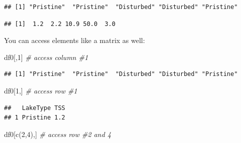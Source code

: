 \documentclass[
]{article}
\newenvironment{Shaded}{\begin{snugshade}}{\end{snugshade}}
\newcommand{\CommentTok}[1]{\textcolor[rgb]{0.56,0.35,0.01}{\textit{#1}}}
\newcommand{\DecValTok}[1]{\textcolor[rgb]{0.00,0.00,0.81}{#1}}
\newcommand{\FunctionTok}[1]{\textcolor[rgb]{0.00,0.00,0.00}{#1}}
\newcommand{\NormalTok}[1]{#1}
\newcommand{\SpecialCharTok}[1]{\textcolor[rgb]{0.00,0.00,0.00}{#1}}
\begin{document}
\begin{Shaded}
\end{Shaded}

\begin{verbatim}
## [1] "Pristine"  "Pristine"  "Disturbed" "Disturbed" "Pristine"
\end{verbatim}

\begin{Shaded}
\end{Shaded}

\begin{verbatim}
## [1]  1.2  2.2 10.9 50.0  3.0
\end{verbatim}

You can access elements like a matrix as well:

\begin{Shaded}
\begin{Highlighting}[]
\NormalTok{df0[,}\DecValTok{1}\NormalTok{] }\CommentTok{\# access column \#1}
\end{Highlighting}
\end{Shaded}

\begin{verbatim}
## [1] "Pristine"  "Pristine"  "Disturbed" "Disturbed" "Pristine"
\end{verbatim}

\begin{Shaded}
\begin{Highlighting}[]
\NormalTok{df0[}\DecValTok{1}\NormalTok{,] }\CommentTok{\# access row \#1}
\end{Highlighting}
\end{Shaded}

\begin{verbatim}
##   LakeType TSS
## 1 Pristine 1.2
\end{verbatim}

\begin{Shaded}
\begin{Highlighting}[]
\NormalTok{df0[}\FunctionTok{c}\NormalTok{(}\DecValTok{2}\NormalTok{,}\DecValTok{4}\NormalTok{),] }\CommentTok{\# access row \#2 and 4}
\end{Highlighting}
\end{Shaded}
\end{document}
